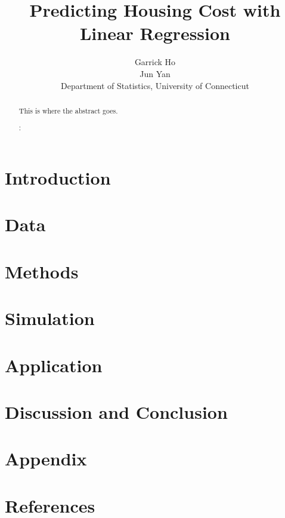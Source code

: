 \documentclass[12pt]{article}
\title{Predicting Housing Cost with Linear Regression}
\author{Garrick Ho\\
  Jun Yan\\[2ex]
  Department of Statistics, University of Connecticut\\
}
\begin{document}
\maketitle
\doublespace

\begin{abstract}
    This is where the abstract goes.

\bigskip
{}:


\end{abstract}

\section{Introduction}

\section{Data}

\section{Methods}

\section{Simulation}

\section{Application}

\section{Discussion and Conclusion}

\section{Appendix}

\section{References}
\end{document}

